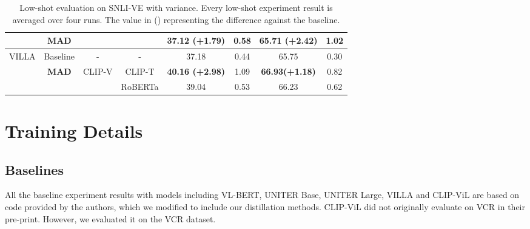 \documentclass[runningheads]{llncs}
\begin{document}
\begin{table}[h!]
{\begin{tabular}{|c|c|cc|cccc|}
                                                                        & \textbf{MAD} & \multicolumn{1}{c|}{}                        &                         & \multicolumn{1}{c|}{\textbf{37.12 (+1.79)}}     & \multicolumn{1}{c|}{0.58}     & \multicolumn{1}{c|}{\textbf{65.71 (+2.42)}}               & 1.02               \\ \hline
\multirow{3}{*}{VILLA}                                                  & Baseline            & \multicolumn{1}{c|}{-}                       & -                       & \multicolumn{1}{c|}{37.18}                      & \multicolumn{1}{c|}{0.44}     & \multicolumn{1}{c|}{65.75}                                & 0.30               \\ \cline{2-8}
                                                                        & \textbf{MAD} & \multicolumn{1}{c|}{\multirow{2}{*}{CLIP-V}} & CLIP-T                  & \multicolumn{1}{c|}{\textbf{40.16 (+2.98)}}     & \multicolumn{1}{c|}{1.09}     & \multicolumn{1}{c|}{\textbf{66.93(+1.18)}}               & 0.82               \\ \cline{2-2} \cline{4-8}
                                                                        &                     & \multicolumn{1}{c|}{}                        & RoBERTa                 & \multicolumn{1}{c|}{39.04}                      & \multicolumn{1}{c|}{0.53}     & \multicolumn{1}{c|}{66.23}                                & 0.62               \\ \hline
\end{tabular}}
\caption{Low-shot evaluation on SNLI-VE with variance. Every low-shot experiment result is averaged over four runs.  The value in () representing the difference against the baseline.}
\label{tab:snlivelowshot}
\end{table}


\section{Training Details}
\label{sec:trainingdetails}
\subsection{Baselines}
\label{sec:trainingdetails-baselines}

All the baseline experiment results with models including VL-BERT, UNITER Base, UNITER Large, VILLA and CLIP-ViL are based on code provided by the authors, which we modified to include our distillation methods. CLIP-ViL did not originally evaluate on VCR in their pre-print. However, we evaluated it on the VCR dataset.
\end{document}

